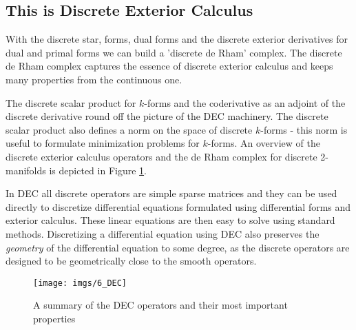  
\subsection{This is Discrete Exterior Calculus}


With the discrete star, forms, dual forms and the discrete exterior derivatives for dual and primal forms we can build a 'discrete de Rham' complex. The discrete de Rham complex captures the essence of discrete exterior calculus and keeps many properties from the continuous one. 

The discrete scalar product for $k$-forms and the coderivative as an adjoint of the discrete derivative round off the picture of the DEC machinery. The discrete scalar product also defines a norm on the space of discrete $k$-forms - this norm is useful to formulate minimization problems for $k$-forms.
An overview of the discrete exterior calculus operators and the de Rham complex for discrete 2-manifolds is depicted in Figure \ref{fig:DEC}. 

In DEC all discrete operators are simple sparse matrices and they can be used directly to discretize differential equations formulated using differential forms and exterior calculus. These linear equations are then easy to solve using standard methods. Discretizing a differential equation using DEC also preserves the \emph{geometry} of the differential equation to some degree, as the discrete operators are designed to be geometrically close to the smooth operators.


\begin{figure}%
\begin{center}
\texttt{[image: imgs/6\_DEC]}%
\end{center}
\caption{A summary of the DEC operators and their most important properties}%
\label{fig:DEC}%
\end{figure}
